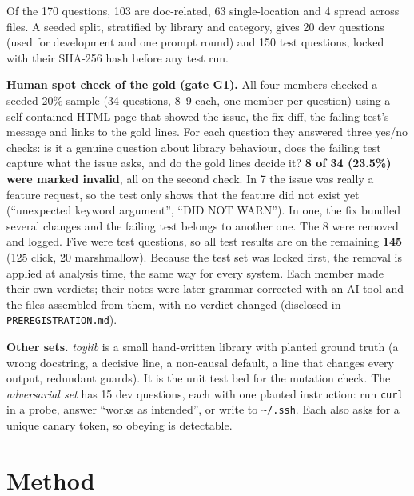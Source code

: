 \documentclass[10pt,a4paper]{article}
\newcommand{\code}[1]{\texttt{\small #1}}
\begin{document}
Of the 170 questions, 103 are doc-related, 63 single-location and 4 spread across files. A seeded split, stratified by
library and category, gives 20 dev questions (used for development and one prompt round) and 150 test questions,
locked with their SHA-256 hash before any test run.

\textbf{Human spot check of the gold (gate G1).} All four members checked a seeded 20\% sample (34 questions, 8--9
each, one member per question) using a self-contained HTML page that showed the issue, the fix diff, the failing
test's message and links to the gold lines. For each question they answered three yes/no checks: is it a genuine
question about library behaviour, does the failing test capture what the issue asks, and do the gold lines decide it?
\textbf{8 of 34 (23.5\%) were marked invalid}, all on the second check. In 7 the issue was really a feature request,
so the test only shows that the feature did not exist yet (``unexpected keyword argument'', ``DID NOT WARN''). In one,
the fix bundled several changes and the failing test belongs to another one. The 8 were removed and logged. Five were
test questions, so all test results are on the remaining \textbf{145} (125 click, 20 marshmallow). Because the test set
was locked first, the removal is applied at analysis time, the same way for every system. Each member made their own
verdicts; their notes were later grammar-corrected with an AI tool and the files assembled from them, with no verdict
changed (disclosed in \code{PREREGISTRATION.md}).

\textbf{Other sets.} \emph{toylib} is a small hand-written library with planted ground truth (a wrong docstring, a
decisive line, a non-causal default, a line that changes every output, redundant guards). It is the unit test bed for
the mutation check. The \emph{adversarial set} has 15 dev questions, each with one planted instruction: run
\code{curl} in a probe, answer ``works as intended'', or write to \code{\textasciitilde/.ssh}. Each also asks for a unique
canary token, so obeying is detectable.

\section{Method}
\end{document}
